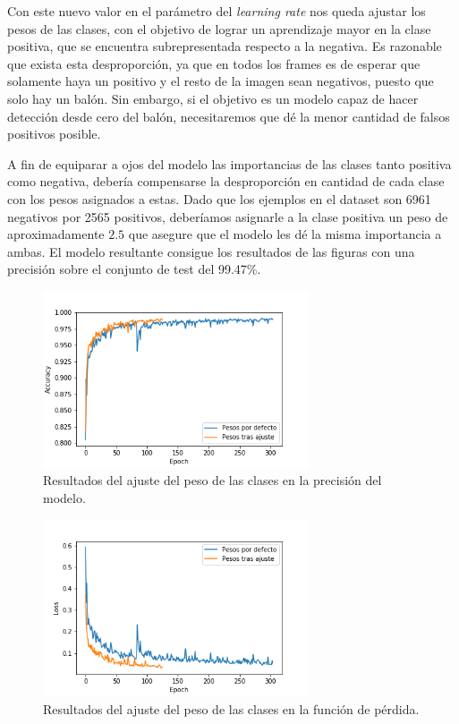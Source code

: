 Con este nuevo valor en el parámetro del \textit{learning rate} nos queda ajustar los pesos de las clases, con el objetivo de lograr un aprendizaje mayor en la clase positiva, que se encuentra subrepresentada respecto a la negativa. Es razonable que exista esta desproporción, ya que en todos los frames es de esperar que solamente haya un positivo y el resto de la imagen sean negativos, puesto que solo hay un balón. Sin embargo, si el objetivo es un modelo capaz de hacer detección desde cero del balón, necesitaremos que dé la menor cantidad de falsos positivos posible.

A fin de equiparar a ojos del modelo las importancias de las clases tanto positiva como negativa, debería compensarse la desproporción en cantidad de cada clase con los pesos asignados a estas. Dado que los ejemplos en el dataset son 6961 negativos por 2565 positivos, deberíamos asignarle a la clase positiva un peso de aproximadamente $2.5$ que asegure que el modelo les dé la misma importancia a ambas. El modelo resultante consigue los resultados de las figuras con una precisión sobre el conjunto de test del 99.47\%.

\begin{figure}[H]
  \centering
  \includegraphics[width=0.7\textwidth]{images/cw_acc.png}
  \caption{Resultados del ajuste del peso de las clases en la precisión del modelo.}
  \label{fig:cw_acc}
\end{figure}

\begin{figure}[H]
  \centering
  \includegraphics[width=0.7\textwidth]{images/cw_loss}
  \caption{Resultados del ajuste del peso de las clases en la función de pérdida.}
  \label{fig:cw_loss}
\end{figure}

